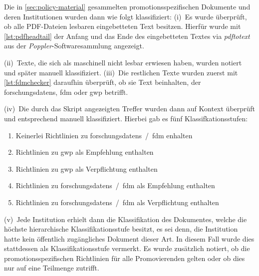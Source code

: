 Die in \cref{sec:policy-material} gesammelten promotionsspezifischen Dokumente und deren Institutionen wurden dann wie folgt klassifiziert:
(i)~Es wurde überprüft, ob alle PDF-Dateien lesbaren eingebetteten Text besitzen.
Hierfür wurde mit \cref{lst:pdfheadtail} der Anfang und das Ende des eingebetteten Textes via \emph{pdftotext} aus der \emph{Poppler}-Softwaresammlung \autocite{Poppler} angezeigt.

(ii)~Texte, die sich als maschinell nicht lesbar erwiesen haben, wurden notiert und später manuell klassifiziert.
(iii)~Die restlichen Texte wurden zuerst mit \cref{lst:fdmchecker} daraufhin überprüft, ob sie Text beinhalten, der \glspl{forschungsdaten}, \gls{fdm} oder \gls{gwp} betrifft.

(iv)~Die durch das Skript angezeigten Treffer wurden dann auf Kontext überprüft und entsprechend manuell klassifiziert.
Hierbei gab es fünf Klassifkationsstufen:
\begin{enumerate}
    \item Keinerlei Richtlinien zu \glspl{forschungsdaten}~/~\gls{fdm} enhalten
    \item Richtlinien zu \gls{gwp} als Empfehlung enthalten
    \item Richtlinien zu \gls{gwp} als Verpflichtung enthalten
    \item Richtlinien zu \glspl{forschungsdaten}~/~\gls{fdm} als Empfehlung enthalten
    \item Richtlinien zu \glspl{forschungsdaten}~/~\gls{fdm} als Verpflichtung enthalten
\end{enumerate}
(v)~Jede Institution erhielt dann die Klassifikation des Dokumentes, welche die höchste hierarchische Klassifikationsstufe besitzt, es sei denn, die Institution hatte kein öffentlich zugängliches Dokument dieser Art.
In diesem Fall wurde dies stattdessen als Klassifikationsstufe vermerkt.
Es wurde zusätzlich notiert, ob die promotionsspezifischen Richtlinien für alle Promovierenden gelten oder ob dies nur auf eine Teilmenge zutrifft.

